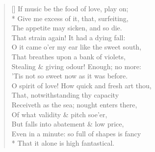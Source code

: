 \documentclass[MAIN]{subfiles}
\begin{document}
\settowidth{\versewidth}{O spirit of love! How quick and fresh art thou,}
\begin{verse}[\versewidth]
If music be the food of love, play on;\\*
Give me excess of it, that, surfeiting,\\
The appetite may sicken, and so die.\\
That strain again! It had a dying fall:\\
O it came o'er my ear like the sweet south,\\
That breathes upon a bank of violets,\\
Stealing \& giving odour! Enough; no more:\\
'Tis not so sweet now as it was before.\\
O spirit of love! How quick and fresh art thou,\\
That, notwithstanding thy capacity\\
Receiveth as the sea; nought enters there,\\
Of what validity \& pitch soe'er,\\
But falls into abatement \& low price,\\
Even in a minute: so full of shapes is fancy\\*
That it alone is high fantastical.
\end{verse}
\end{document}
